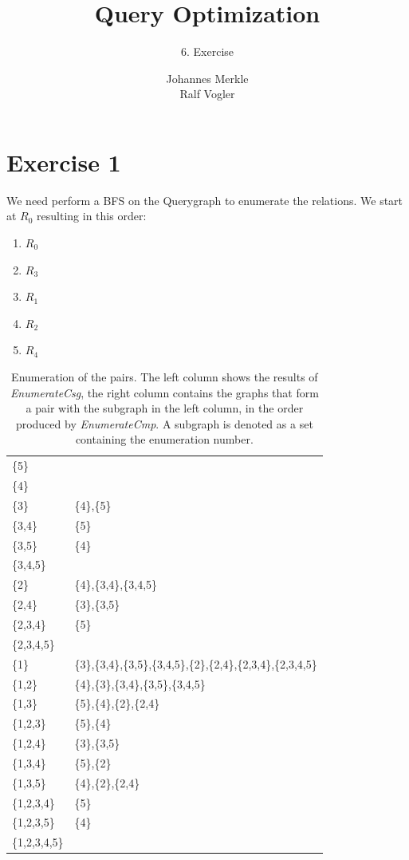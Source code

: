 \documentclass[11pt,a4paper]{scrartcl}
\begin{document}
\author{Johannes Merkle\\Ralf Vogler}
\title{Query Optimization}
\subtitle{6. Exercise}

\maketitle

\section*{Exercise 1}

We need perform a BFS on the Querygraph to enumerate the relations. We start at $R_0$ resulting in this order:\\
\begin{enumerate}
\item $R_0$
\item $R_3$
\item $R_1$
\item $R_2$
\item $R_4$
\end{enumerate}

\begin{table}[H]
\centering
\begin{tabular}{|l|l|}
\hline
\{5\} &  \\
\{4\} &  \\
\{3\} & \{4\},\{5\} \\
\{3,4\} & \{5\} \\
\{3,5\} & \{4\} \\
\{3,4,5\} & \\
\{2\} & \{4\},\{3,4\},\{3,4,5\} \\
\{2,4\} & \{3\},\{3,5\} \\
\{2,3,4\} & \{5\} \\
\{2,3,4,5\} &  \\
\{1\} & \{3\},\{3,4\},\{3,5\},\{3,4,5\},\{2\},\{2,4\},\{2,3,4\},\{2,3,4,5\} \\
\{1,2\} & \{4\},\{3\},\{3,4\},\{3,5\},\{3,4,5\} \\
\{1,3\} & \{5\},\{4\},\{2\},\{2,4\} \\
\{1,2,3\} & \{5\},\{4\} \\
\{1,2,4\} & \{3\},\{3,5\} \\
\{1,3,4\} & \{5\},\{2\} \\
\{1,3,5\} & \{4\},\{2\},\{2,4\} \\
\{1,2,3,4\} & \{5\} \\
\{1,2,3,5\} & \{4\} \\
\{1,2,3,4,5\} &  \\
\hline
\end{tabular}
\caption{Enumeration of the pairs. The left column shows the results of \textit{EnumerateCsg}, the right column contains the graphs that form a pair with the subgraph in the left column, in the order produced by \textit{EnumerateCmp}. A subgraph is denoted as a set containing the enumeration number.}
\label{tab:dp}
\end{table}
\end{document}
